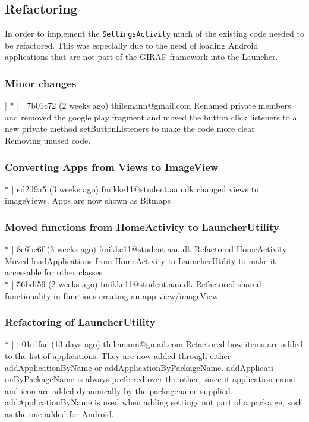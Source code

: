 \subsection{Refactoring}\label{sect:sprint3:refactoring}
In order to implement the \lstinline!SettingsActivity! much of the existing code needed to be refactored.
This was especially due to the need of loading Android applications that are not part of the GIRAF framework  into the Launcher. 

\subsubsection{Minor changes}
| * | | 7b01c72 (2 weeks ago) thilemann@gmail.com Renamed private members and removed the google play fragment and moved the button click listeners to a new private method setButtonListeners to make the code
 more clear\\
 
 Removing unused code.\\
 
\subsubsection{Converting Apps from Views to ImageView}
* | ed2d9a5 (3 weeks ago) fmikke11@student.aau.dk changed views to imageViews. Apps are now shown as Bitmaps\\

\subsubsection{Moved functions from HomeActivity to LauncherUtility}
* | 8e6bc6f (3 weeks ago) fmikke11@student.aau.dk Refactored HomeActivity - Moved loadApplications from HomeActivity to LauncherUtility to make it accessable for other classes\\
* | 56bdf59 (2 weeks ago) fmikke11@student.aau.dk Refactored shared functionality in functions creating an app view/imageView\\

\subsubsection{Refactoring of LauncherUtility}
* | | 01e1fae (13 days ago) thilemann@gmail.com Refactored how items are added to the list of applications. They are now added through either addApplicationByName or addApplicationByPackageName. addApplicati
onByPackageName is always preferred over the other, since it application name and icon are added dynamically by the packagename supplied. addApplicationByName is used when adding settings not part of a packa
ge, such as the one added for Android.\\

